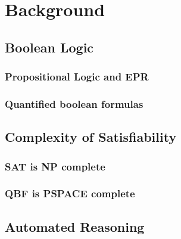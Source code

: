 \chapter{Background}

\section{Boolean Logic}
\subsection{Propositional Logic and EPR}
\subsection{Quantified boolean formulas}

\section{Complexity of Satisfiability}
\subsection{SAT is NP complete}
\subsection{QBF is PSPACE complete}

\section{Automated Reasoning}
